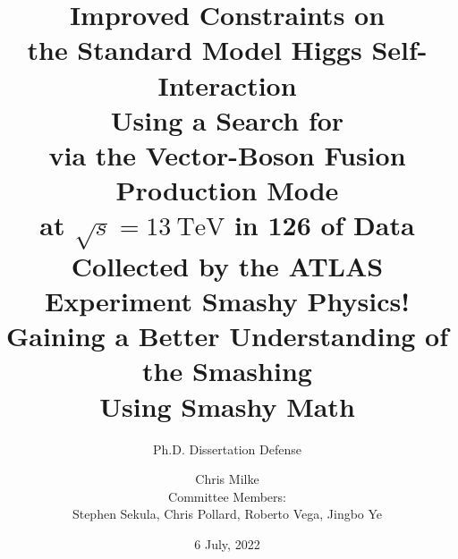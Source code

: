 \documentclass{beamer}
\begin{document}
\title{
    Improved Constraints on \\the Standard Model Higgs Self-Interaction \\
    Using a Search for \hhbbbb \\via the Vector-Boson Fusion Production Mode \\
    at $\sqrt{s}=13~\mathrm{TeV}$ in 126 \ifb of Data \\Collected by the ATLAS Experiment
}
\subtitle{\vspace{3mm}Ph.D. Dissertation Defense}

\author{Chris Milke\\{\small Committee Members:\\Stephen Sekula, Chris Pollard, Roberto Vega, Jingbo Ye}}
\date{6 July, 2022}

\frame{\titlepage}
\title{
    Smashy Physics!\\Gaining a Better Understanding of the Smashing\\Using Smashy Math
}
\frame{\titlepage}











\end{document}
